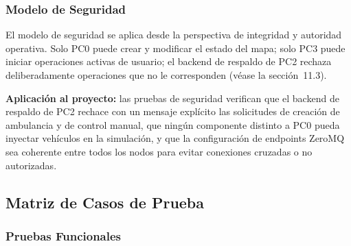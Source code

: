 \documentclass[12pt, a4paper]{article}
\begin{document}
\subsubsection{Modelo de Seguridad}

El modelo de seguridad se aplica desde la perspectiva de integridad y autoridad operativa. Solo PC0 puede crear y modificar el estado del mapa; solo PC3 puede iniciar operaciones activas de usuario; el backend de respaldo de PC2 rechaza deliberadamente operaciones que no le corresponden (véase la sección~11.3).

\textbf{Aplicación al proyecto:} las pruebas de seguridad verifican que el backend de respaldo de PC2 rechace con un mensaje explícito las solicitudes de creación de ambulancia y de control manual, que ningún componente distinto a PC0 pueda inyectar vehículos en la simulación, y que la configuración de endpoints ZeroMQ sea coherente entre todos los nodos para evitar conexiones cruzadas o no autorizadas.



\subsection{Matriz de Casos de Prueba}

\subsubsection{Pruebas Funcionales}
\end{document}
